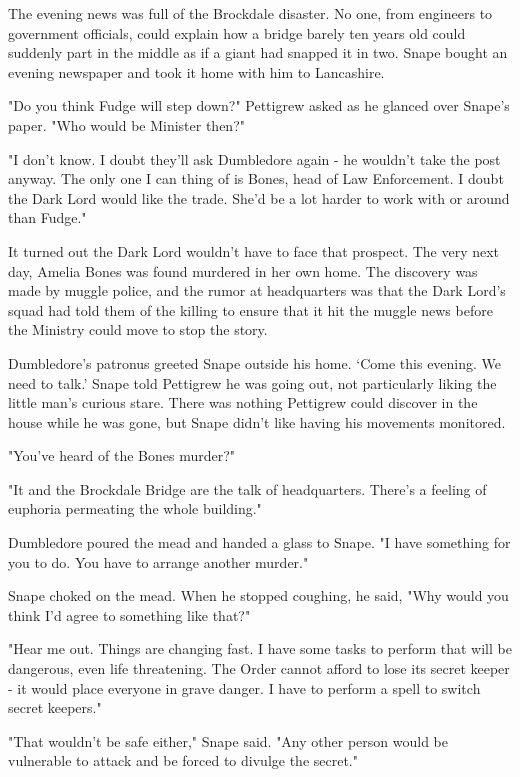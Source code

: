 The evening news was full of the Brockdale disaster. No one, from engineers to government officials, could explain how a bridge barely ten years old could suddenly part in the middle as if a giant had snapped it in two. Snape bought an evening newspaper and took it home with him to Lancashire.

"Do you think Fudge will step down?" Pettigrew asked as he glanced over Snape's paper. "Who would be Minister then?"

"I don't know. I doubt they'll ask Dumbledore again - he wouldn't take the post anyway. The only one I can thing of is Bones, head of Law Enforcement. I doubt the Dark Lord would like the trade. She'd be a lot harder to work with or around than Fudge."

It turned out the Dark Lord wouldn't have to face that prospect. The very next day, Amelia Bones was found murdered in her own home. The discovery was made by muggle police, and the rumor at headquarters was that the Dark Lord's squad had told them of the killing to ensure that it hit the muggle news before the Ministry could move to stop the story.

Dumbledore's patronus greeted Snape outside his home. `Come this evening. We need to talk.' Snape told Pettigrew he was going out, not particularly liking the little man's curious stare. There was nothing Pettigrew could discover in the house while he was gone, but Snape didn't like having his movements monitored.

\sbreak

"You've heard of the Bones murder?"

"It and the Brockdale Bridge are the talk of headquarters. There's a feeling of euphoria permeating the whole building."

Dumbledore poured the mead and handed a glass to Snape. "I have something for you to do. You have to arrange another murder."

Snape choked on the mead. When he stopped coughing, he said, "Why would you think I'd agree to something like that?"

"Hear me out. Things are changing fast. I have some tasks to perform that will be dangerous, even life threatening. The Order cannot afford to lose its secret keeper - it would place everyone in grave danger. I have to perform a spell to switch secret keepers."

"That wouldn't be safe either," Snape said. "Any other person would be vulnerable to attack and be forced to divulge the secret."

